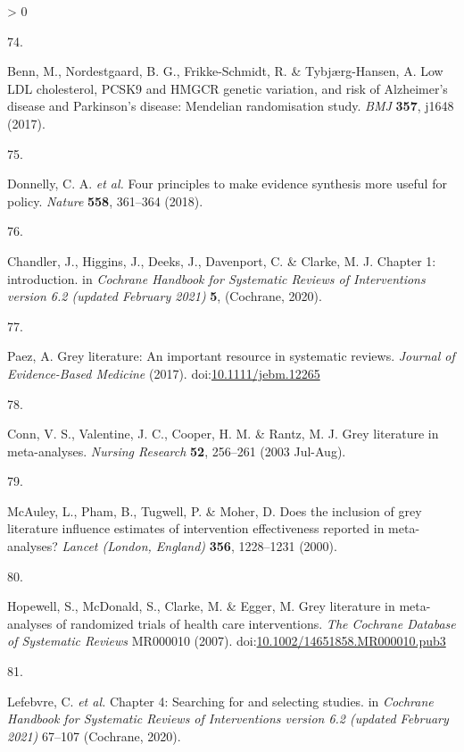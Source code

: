\documentclass[a4paper, twoside]{templates/ociamthesis}
\newlength{\cslhangindent}
\newlength{\csllabelwidth}
\newenvironment{CSLReferences}[3] %
 {%
  \setlength{\parindent}{0pt}
  \ifodd #1 \everypar{\setlength{\hangindent}{\cslhangindent}}\ignorespaces\fi
  \ifnum #2 > 0
  \setlength{\parskip}{#2\baselineskip}
  \fi
 }%
 {}
\newcommand{\CSLLeftMargin}[1]{\parbox[t]{\maxof{\widthof{#1}}{\csllabelwidth}}{#1}}
\newcommand{\CSLRightInline}[1]{\parbox[t]{\linewidth - \csllabelwidth}{#1}}
\begin{document}
\begin{CSLReferences}{0}{0}
\leavevmode\hypertarget{ref-benn2017}{}%
\CSLLeftMargin{74. }
\CSLRightInline{Benn, M., Nordestgaard, B. G., Frikke-Schmidt, R. \& Tybjærg-Hansen, A. Low {LDL} cholesterol, {PCSK9} and {HMGCR} genetic variation, and risk of {Alzheimer}'s disease and {Parkinson}'s disease: Mendelian randomisation study. \emph{BMJ} \textbf{357}, j1648 (2017).}

\leavevmode\hypertarget{ref-donnelly2018}{}%
\CSLLeftMargin{75. }
\CSLRightInline{Donnelly, C. A. \emph{et al.} Four principles to make evidence synthesis more useful for policy. \emph{Nature} \textbf{558}, 361--364 (2018).}

\leavevmode\hypertarget{ref-chandler2019chapter}{}%
\CSLLeftMargin{76. }
\CSLRightInline{Chandler, J., Higgins, J., Deeks, J., Davenport, C. \& Clarke, M. J. Chapter 1: introduction. in \emph{Cochrane {Handbook} for {Systematic Reviews} of {Interventions} version 6.2 (updated {February} 2021)} \textbf{5}, ({Cochrane}, 2020).}

\leavevmode\hypertarget{ref-paez2017}{}%
\CSLLeftMargin{77. }
\CSLRightInline{Paez, A. Grey literature: An important resource in systematic reviews. \emph{Journal of Evidence-Based Medicine} (2017). doi:\href{https://doi.org/10.1111/jebm.12265}{10.1111/jebm.12265}}

\leavevmode\hypertarget{ref-conn2003}{}%
\CSLLeftMargin{78. }
\CSLRightInline{Conn, V. S., Valentine, J. C., Cooper, H. M. \& Rantz, M. J. Grey literature in meta-analyses. \emph{Nursing Research} \textbf{52}, 256--261 (2003 Jul-Aug).}

\leavevmode\hypertarget{ref-mcauley2000}{}%
\CSLLeftMargin{79. }
\CSLRightInline{McAuley, L., Pham, B., Tugwell, P. \& Moher, D. Does the inclusion of grey literature influence estimates of intervention effectiveness reported in meta-analyses? \emph{Lancet (London, England)} \textbf{356}, 1228--1231 (2000).}

\leavevmode\hypertarget{ref-hopewell2007}{}%
\CSLLeftMargin{80. }
\CSLRightInline{Hopewell, S., McDonald, S., Clarke, M. \& Egger, M. Grey literature in meta-analyses of randomized trials of health care interventions. \emph{The Cochrane Database of Systematic Reviews} MR000010 (2007). doi:\href{https://doi.org/10.1002/14651858.MR000010.pub3}{10.1002/14651858.MR000010.pub3}}

\leavevmode\hypertarget{ref-lefebvre2019searching}{}%
\CSLLeftMargin{81. }
\CSLRightInline{Lefebvre, C. \emph{et al.} Chapter 4: Searching for and selecting studies. in \emph{Cochrane {Handbook} for {Systematic Reviews} of {Interventions} version 6.2 (updated {February} 2021)} 67--107 ({Cochrane}, 2020).}


\end{CSLReferences}
\end{document}
